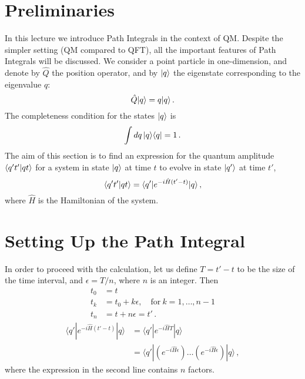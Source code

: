 \newcommand{\epsstep}{\left(e^{-i \hat{H} \epsilon}\right)}

\section{Preliminaries}
\label{sec:preliminaries-1}

In this lecture we introduce Path Integrals in the context of
QM. Despite the simpler setting (QM compared to QFT), all the
important features of Path Integrals will be discussed. We consider a
point particle in one-dimension, and denote by $\hat{Q}$ the position
operator, and by $| q \rangle$ the eigenstate corresponding to the eigenvalue
$q$:
\begin{equation}
  \label{eq:QEigen}
  \hat{Q} | q \rangle = q | q \rangle\, .
\end{equation}
The completeness condition for the states $| q \rangle$ is
\begin{equation}
  \label{eq:qComplete}
  \int dq\, | q \rangle\langle q | = 1\, .
\end{equation}
The aim of this section is to find an expression for the quantum
amplitude $\langle q't' | qt \rangle$ for a system in state $| q \rangle$ at time
$t$ to evolve in state $| q' \rangle$ at time $t'$,
\begin{equation}
  \label{eq:AmplitudeDef}
  \langle q't' | qt \rangle = \langle q' | e^{-i \hat{H} (t'-t)}|q\rangle\, ,
\end{equation}
where $\hat{H}$ is the Hamiltonian of the system. 

\section{Setting Up the Path Integral}
\label{sec:setting-up-path}

In order to proceed with the calculation, let us define $T=t'-t$ to be
the size of the time interval, and $\epsilon=T/n$, where $n$ is an
integer. Then 
\begin{align}
  t_0 &= t \\
  t_k &= t_0 + k \epsilon, \quad \text{for}\ k=1, \ldots, n-1 \\
  t_n &= t + n \epsilon = t'\, .
\end{align}
\begin{align}
  \langle q' | e^{-i \hat{H} (t'-t)}|q\rangle &= 
                 \langle q' | e^{-i \hat{H} T} | q\rangle \\
               &= \langle q' | \left(e^{-i \hat{H} \epsilon}\right)
                 \ldots \left(e^{-i \hat{H} \epsilon}\right) |
                 q\rangle\, ,
\end{align}
where the expression in the second line contains $n$ factors. 

